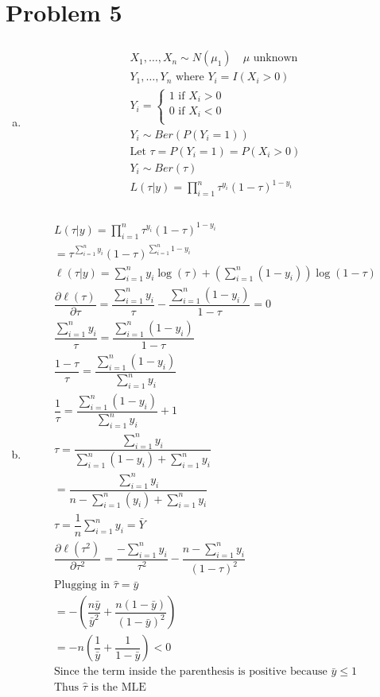 \documentclass{article}
\newcommand{\sumn}{\sum_{i=1}^{n}}
\newcommand{\dll}[1]{\dfrac{\partial\ell({#1})}{\partial{#1}}}
\newcommand{\prodn}{\prod_{i=1}^{n}}
\begin{document}
\begin{flushleft}
\begin{enumerate}[(a)]
\end{enumerate}
\pagebreak
	\section*{Problem 5}
\begin{enumerate}[(a)]
	
	\item 
\begin{multline*}\\
X_1,\dots,X_n \sim N(\mu_1) \quad \mu \text{ unknown}\\
Y_1,\dots,Y_n \text{ where } Y_i=I(X_i>0)\\
Y_i=\begin{cases}
1 \text{ if } X_i>0\\
0 \text{ if } X_i<0\\
\end{cases}\\
Y_i\sim Ber(P(Y_i=1))\\
\text{Let } \tau=P(Y_i=1)=P(X_i>0)\\
Y_i\sim Ber(\tau)\\
L(\tau|y)=\prodn \tau^{y_i}(1-\tau)^{1-y_i}\\
\end{multline*}

	\item 
\begin{multline*}\\
L(\tau|y)=\prodn \tau^{y_i}(1-\tau)^{1-y_i}\\
=\tau^{\sumn y_i}(1-\tau)^{\sumn 1- y_i}\\
\ell(\tau|y)=\sumn y_i \log(\tau)+(\sumn (1-y_i))\log(1-\tau)\\
\dll{\tau}=\dfrac{\sumn y_i}{\tau}-\dfrac{\sumn (1-y_i)}{1-\tau}=0\\
\dfrac{\sumn y_i}{\tau}=\dfrac{\sumn (1-y_i)}{1-\tau}\\
\dfrac{1-\tau}{\tau}=\dfrac{\sumn(1-y_i)}{\sumn y_i}\\
\dfrac{1}{\tau}=\dfrac{\sumn(1-y_i)}{\sumn y_i}+1\\
\hat{\tau}=\dfrac{\sumn y_i}{\sumn(1-y_i)+\sumn y_i}\\
=\dfrac{\sumn y_i}{n-\sumn(y_i)+\sumn y_i}\\
\hat{\tau}=\dfrac{1}{n}\sumn{y_i}=\bar{Y}\\
\dll{\tau^2}=\dfrac{-\sumn y_i}{\tau^2}-\dfrac{n-\sumn y_i}{(1-\tau)^2}\\
\text{Plugging in } \hat{\tau}=\bar{y}\\
=-\left(\dfrac{n\bar{y}}{\bar{y}^2}+\dfrac{n(1-\bar{y})}{(1-\bar{y})^2} \right)\\
=-n\left(\dfrac{1}{\bar{y}}+\dfrac{1}{1-\bar{y}}\right)<0\\
\text{Since the term inside the parenthesis is positive because } \bar{y}\leq1\\
\text{Thus } \hat{\tau} \text{ is the MLE}\\
\end{multline*}


\end{enumerate}
\end{flushleft}
\end{document}
